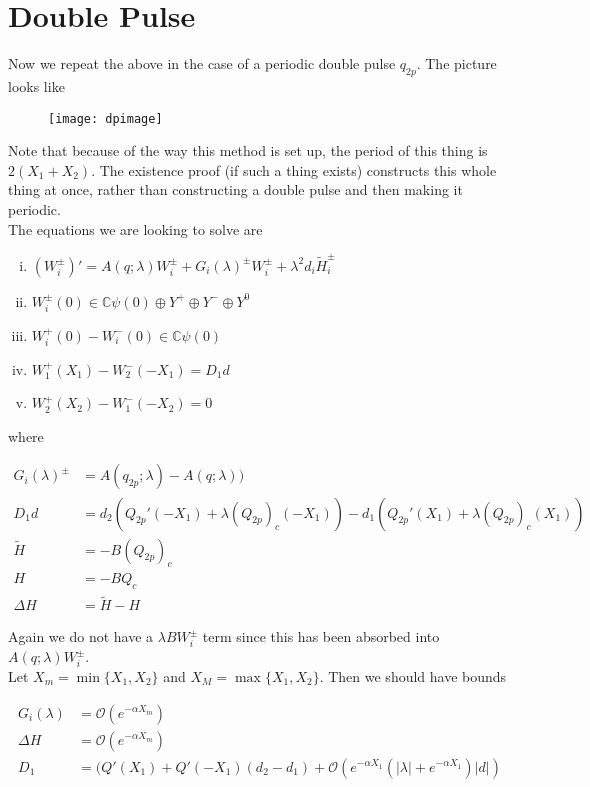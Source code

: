 \documentclass[12pt]{article}
\def\C{{\mathbb C}}
\begin{document}
\section*{Double Pulse}

Now we repeat the above in the case of a periodic double pulse $q_{2p}$. The picture looks like

\begin{figure}[H]
\texttt{[image: dpimage]}
\end{figure}

Note that because of the way this method is set up, the period of this thing is $2(X_1 + X_2)$. The existence proof (if such a thing exists) constructs this whole thing at once, rather than constructing a double pulse and then making it periodic. \\

The equations we are looking to solve are

\begin{enumerate}[(i)]
\item $(W_i^\pm)' = A(q; \lambda) W_i^\pm + G_i(\lambda)^\pm W_i^\pm + \lambda^2 d_i \tilde{H}_i^\pm$
\item $W_i^\pm(0) \in \C \psi(0) \oplus Y^+ \oplus Y^- \oplus Y^0$
\item $W_i^+(0) - W_i^-(0) \in \C \psi(0) $
\item $W_1^+(X_1) - W_2^-(-X_1) = D_1 d $
\item $W_2^+(X_2) - W_1^-(-X_2) = 0$
\end{enumerate}

where

\begin{align*}
G_i(\lambda)^\pm &= A(q_{2p};\lambda) - A(q;\lambda)) \\
D_1 d &= d_2(Q_{2p}'(-X_1) + \lambda (Q_{2p})_c(-X_1)) 
- d_1 ( Q_{2p}'(X_1) + \lambda (Q_{2p})_c(X_1) ) \\
\tilde{H} &= -B(Q_{2p})_c \\
H &= -B Q_c \\
\Delta H &= \tilde{H} - H
\end{align*}

Again we do not have a $\lambda B W_i^\pm$ term since this has been absorbed into $A(q; \lambda) W_i^\pm$. \\

Let $X_m = \min\{ X_1, X_2 \}$ and $X_M = \max\{ X_1, X_2 \}$. Then we should have bounds

\begin{align*}
G_i(\lambda) &= \mathcal{O}(e^{-\alpha X_m}) \\
\Delta H &= \mathcal{O}(e^{-\alpha X_m}) \\
D_1 &= ( Q'(X_1) + Q'(-X_1 )(d_2 - d_1 ) + \mathcal{O} \left( e^{-\alpha X_1} \left( |\lambda| +  e^{-\alpha X_1}  \right) |d| \right)
\end{align*}
\end{document}
